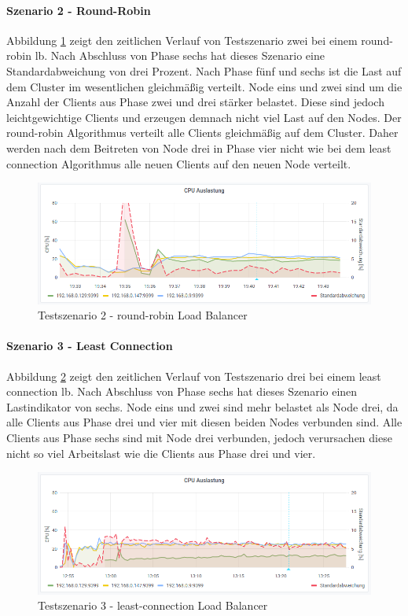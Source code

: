 \paragraph{Szenario 2 - Round-Robin}
Abbildung \ref{fig:s2-rr} zeigt den zeitlichen Verlauf von Testszenario zwei bei einem round-robin \ac{lb}.
Nach Abschluss von Phase sechs hat dieses Szenario eine Standardabweichung von drei Prozent.
Nach Phase fünf und sechs ist die Last auf dem Cluster im wesentlichen gleichmä{\ss}ig verteilt. Node eins und zwei sind um die Anzahl der Clients aus Phase zwei und drei stärker belastet. Diese sind jedoch leichtgewichtige Clients und erzeugen demnach nicht viel Last auf den Nodes.
Der round-robin Algorithmus verteilt alle Clients gleichmä{\ss}ig auf dem Cluster.
Daher werden nach dem Beitreten von Node drei in Phase vier nicht wie bei dem least connection Algorithmus alle neuen Clients auf den neuen Node verteilt.
\begin{figure}
    \centering
    \includegraphics[scale=0.8]{images/s2_rr.png}
    \caption{Testszenario 2 - round-robin Load Balancer}
    \label{fig:s2-rr}
\end{figure}

\paragraph{Szenario 3 - Least Connection}
Abbildung \ref{fig:s3-lc} zeigt den zeitlichen Verlauf von Testszenario drei bei einem least connection \ac{lb}.
Nach Abschluss von Phase sechs hat dieses Szenario einen Lastindikator von sechs.
Node eins und zwei sind mehr belastet als Node drei, da alle Clients aus Phase drei und vier mit diesen beiden Nodes verbunden sind. Alle Clients aus Phase sechs sind mit Node drei verbunden, jedoch verursachen diese nicht so viel Arbeitslast wie die Clients aus Phase drei und vier.
\begin{figure}
    \centering
    \includegraphics[scale=0.8]{images/s3_lc.png}
    \caption{Testszenario 3 - least-connection Load Balancer}
    \label{fig:s3-lc}
\end{figure}


